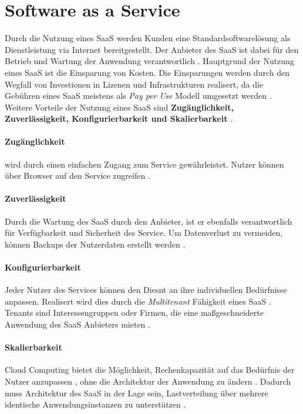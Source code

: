 \section{Software as a Service}
\label{sec:grundlagen:saas}
Durch die Nutzung eines \acf{SaaS} werden Kunden eine Standardsoftwarelösung als Dienstleistung via Internet bereitgestellt.
Der Anbieter des \ac{SaaS} ist dabei für den Betrieb und Wartung der Anwendung verantwortlich \cite{Buxmann2008}.
Hauptgrund der Nutzung eines \ac{SaaS} ist die Einsparung von Kosten.
Die Einsparungen werden durch den Wegfall von Investionen in Lizenen und Infrastrukturen realisert,
da die Gebühren eines \ac{SaaS} meistens als \emph{Pay per Use} Modell umgesetzt werden \cite{Tan2013}.
Weitere Vorteile der Nutzung eines \ac{SaaS} sind \textbf{Zugänglichkeit, Zuverlässigkeit, Konfigurierbarkeit und Skalierbarkeit} \cite{Tan2013}.
\paragraph{Zugänglichkeit}
wird durch einen einfachen Zugang zum Service gewährleistet. Nutzer können über Browser auf den Service zugreifen \cite{Tan2013}.

\paragraph{Zuverlässigkeit}
Durch die Wartung des \ac{SaaS} durch den Anbieter, ist er ebenfalls verantwortlich für Verfügbarkeit und Sicherheit des Service.
Um Datenverlust zu vermeiden, können Backups der Nutzerdaten erstellt werden \cite{Tan2013}.

\paragraph{Konfigurierbarkeit}
Jeder Nutzer des Services können den Diesnt an ihre individuellen Bedürfnisse anpassen.
Realisert wird dies durch die \emph{Multitenant} Fähigkeit eines \ac{SaaS} \cite{Tan2013}.
Tenants sind Interessengruppen oder Firmen, die eine maßgeschneiderte Anwendung des \ac{SaaS} Anbieters mieten \cite{Schroeter2012}.

\paragraph{Skalierbarkeit}
Cloud Computing bietet die Möglichkeit, Rechenkapazität auf das Bedürfnis der Nutzer anzupassen \cite{Tan2013},
ohne die Architektur der Anwendung zu ändern \cite{Satyanarayana2012}.
Dadurch muss Architektur des \ac{SaaS} in der Lage sein, Lastverteilung über mehrere identische Anwendungsinstanzen
zu unterstützen \cite{Satyanarayana2012}.
